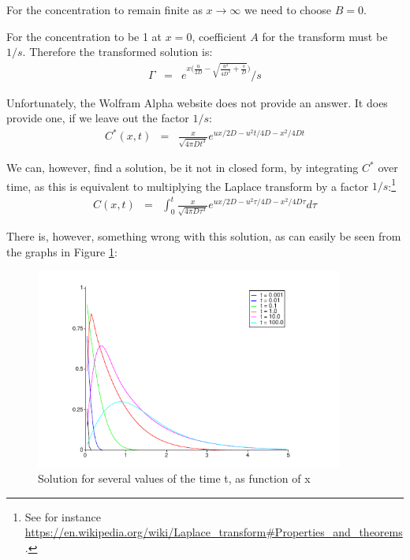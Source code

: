 \documentclass[onecolumn]{article}
\begin{document}
For the concentration to remain finite as $x \rightarrow \infty$ we need to choose $B = 0$.

For the concentration to be 1 at $x = 0$, coefficient $A$ for the transform must be $1/s$. Therefore the transformed
solution is:
\begin{eqnarray}
\nonumber    \Gamma        &=& e^{x \bigl( \frac{u}{2D} - \sqrt{\frac{u^2}{4D^2} + \frac{s}{D}} \bigr)} / s
\end{eqnarray}

Unfortunately, the Wolfram Alpha website does not provide an answer. It does provide one, if we leave out the factor $1/s$:
\begin{eqnarray}
\nonumber     C^*(x,t)     &=& \frac{x}{\sqrt{4 \pi D t^3}} e^{ux/2D -u^2t/4D - x^2 /4Dt}
\end{eqnarray}

We can, however, find a solution, be it not in closed form, by integrating $C^*$ over time, as this is equivalent to
multiplying the Laplace transform by a factor $1/s$:\footnote{See for instance \url{https://en.wikipedia.org/wiki/Laplace_transform\#Properties_and_theorems}.}
\begin{eqnarray}
\nonumber     C(x,t)     &=& \int_0^t \frac{x}{\sqrt{4 \pi D \tau^3}} e^{ ux/2D -u^2 \tau/4D - x^2 /4D \tau} d \tau
\end{eqnarray}

There is, however, something wrong with this solution, as can easily be seen from the graphs in Figure \ref{waterTube}:
\begin{figure}[H]
\caption{Solution for several values of the time t, as function of x}
\label{waterTube}
\begin{center}
\includegraphics[width=0.9\textwidth]{water_tube.pdf}
\end{center}
\end{figure}
\end{document}
